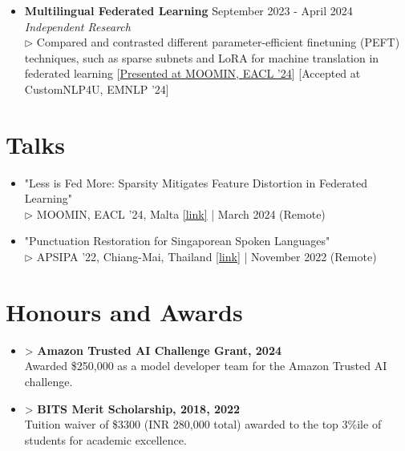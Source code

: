 \documentclass[11pt,letterpaper]{article}
\begin{document}
\begin{itemize}[leftmargin=*,label={},itemsep=6pt]
        \\
    \item \textbf{Multilingual Federated Learning} \hfill September 2023 - April 2024\\
        \textit{Independent Research}\\
        $\triangleright$ 
            Compared and contrasted different parameter-efficient finetuning (PEFT) techniques, such as sparse subnets and LoRA for machine translation in federated learning [\href{https://moomin.eacl.org/}{Presented at MOOMIN, EACL '24}] [Accepted at CustomNLP4U, EMNLP '24]
        \\
\end{itemize}

\section*{Talks}
\begin{itemize}[leftmargin=*,label={},itemsep=4pt]
    \item "Less is Fed More: Sparsity Mitigates Feature Distortion in Federated Learning" \textit{}\\
        $\triangleright$ 
            MOOMIN, EACL '24, Malta  \href{https://moomin.eacl.org/}{[link]} \href{https://docs.google.com/presentation/d/1DmnfMR08y_vW9TXLn8fpqYJkntlPMDuC/edit?usp=sharing}{} | March 2024 (Remote)
        \\
    \item "Punctuation Restoration for Singaporean Spoken Languages" \textit{}\\
        $\triangleright$ 
            APSIPA '22, Chiang-Mai, Thailand  \href{https://www.apsipa.org/conference/2022/}{[link]} \href{https://docs.google.com/presentation/d/1DmnfMR08y_vW9TXLn8fpqYJkntlPMDuC/edit?usp=sharing}{} | November 2022 (Remote)
        \\
\end{itemize}

\section*{Honours and Awards}
\begin{itemize}[leftmargin=*,label={},itemsep=4pt]
    \item > \textbf{\textit{} Amazon Trusted AI Challenge Grant, 2024}\\
        Awarded \$250,000 as a model developer team for the Amazon Trusted AI challenge.
    \item > \textbf{\textit{} BITS Merit Scholarship, 2018, 2022}\\
        Tuition waiver of \$3300 (INR 280,000 total) awarded to the top 3\%ile of students for academic excellence.
\end{itemize}
\end{document}
